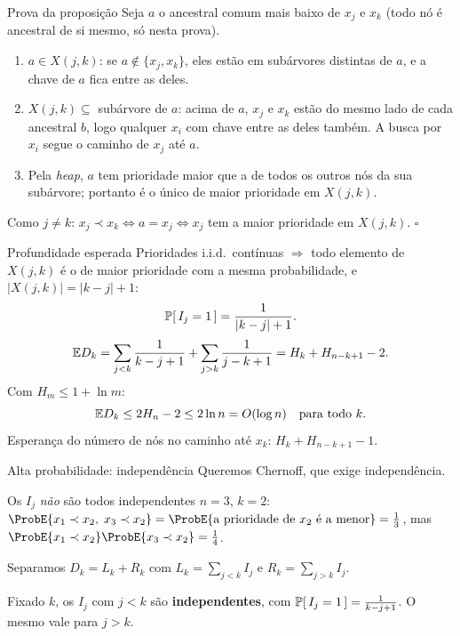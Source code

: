 \documentclass[aspectratio=169,11pt]{beamer}
\theoremstyle{definition}
\begin{document}
\begin{frame}{Prova da proposição}
  Seja $a$ o ancestral comum mais baixo de $x_j$ e $x_k$ (todo nó é
  ancestral de si mesmo, só nesta prova).
  \begin{enumerate}
  \item[(i)] $a\in X(j,k)$: se $a\notin\{x_j,x_k\}$, eles estão em
    subárvores distintas de $a$, e a chave de $a$ fica entre as deles.
    \pause
  \item[(ii)] $X(j,k)\subseteq$ subárvore de $a$: acima de $a$, $x_j$
    e $x_k$ estão do mesmo lado de cada ancestral $b$, logo qualquer
    $x_i$ com chave entre as deles também. A busca por $x_i$ segue o
    caminho de $x_j$ até $a$.
    \pause
  \item[(iii)] Pela \emph{heap}, $a$ tem prioridade maior que a de
    todos os outros nós da sua subárvore; portanto é o único de maior
    prioridade em $X(j,k)$.
  \end{enumerate}
  \pause
  Como $j\neq k$: $x_j\prec x_k\iff a=x_j\iff x_j$ tem a maior
  prioridade em $X(j,k)$. \hfill $\square$
\end{frame}

\begin{frame}{Profundidade esperada}
  Prioridades i.i.d.\ contínuas $\Rightarrow$ todo elemento de $X(j,k)$
  é o de maior prioridade com a mesma probabilidade, e
  $|X(j,k)|=|k-j|+1$:
  \[
    \ProbE{I_j=1}=\frac{1}{|k-j|+1}.
  \]
  \pause
  \[
    \mathbb{E}{D_k}
    =\sum_{j<k}\frac1{k-j+1}+\sum_{j>k}\frac1{j-k+1}
    =H_k+H_{n-k+1}-2 .
  \]
  \pause
  Com $H_m\le1+\ln m$:
  \[
    \mathbb{E}{D_k}\le2H_n-2\le2\ln n=O(\log n)\quad\text{para todo }k.
  \]
  \medskip
  Esperança do número de nós no caminho até $x_k$:
  $H_k+H_{n-k+1}-1$.
\end{frame}

\begin{frame}{Alta probabilidade: independência}
  Queremos Chernoff, que exige independência.

  \begin{alertblock}{Os $I_j$ \emph{não} são todos independentes}
    $n=3$, $k=2$:
    $\ProbE{x_1\prec x_2,\;x_3\prec x_2}
    =\ProbE{\text{a prioridade de }x_2\text{ é a menor}}=\tfrac13$,
    mas $\ProbE{x_1\prec x_2}\ProbE{x_3\prec x_2}=\tfrac14$.
  \end{alertblock}
  \pause
  \vspace{1ex}
  Separamos $D_k=L_k+R_k$ com
  $L_k=\sum_{j<k}I_j$ e $R_k=\sum_{j>k}I_j$.

  \begin{lemma}
    Fixado $k$, os $I_j$ com $j<k$ são \textbf{independentes}, com
    $\ProbE{I_j=1}=\frac1{k-j+1}$. O mesmo vale para $j>k$.
  \end{lemma}
\end{frame}
\end{document}
